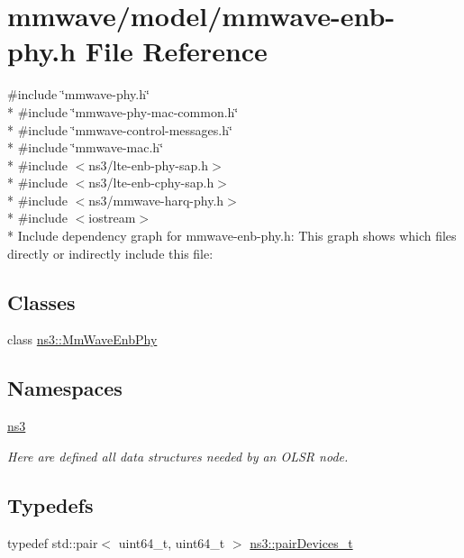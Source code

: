 \hypertarget{mmwave-enb-phy_8h}{}\section{mmwave/model/mmwave-\/enb-\/phy.h File Reference}
\label{mmwave-enb-phy_8h}
{\ttfamily \#include \char`\"{}mmwave-\/phy.\+h\char`\"{}}\\*
{\ttfamily \#include \char`\"{}mmwave-\/phy-\/mac-\/common.\+h\char`\"{}}\\*
{\ttfamily \#include \char`\"{}mmwave-\/control-\/messages.\+h\char`\"{}}\\*
{\ttfamily \#include \char`\"{}mmwave-\/mac.\+h\char`\"{}}\\*
{\ttfamily \#include $<$ns3/lte-\/enb-\/phy-\/sap.\+h$>$}\\*
{\ttfamily \#include $<$ns3/lte-\/enb-\/cphy-\/sap.\+h$>$}\\*
{\ttfamily \#include $<$ns3/mmwave-\/harq-\/phy.\+h$>$}\\*
{\ttfamily \#include $<$iostream$>$}\\*
Include dependency graph for mmwave-\/enb-\/phy.h\+:
This graph shows which files directly or indirectly include this file\+:
\subsection*{Classes}
\begin{DoxyCompactItemize}
\item 
class \hyperlink{classns3_1_1MmWaveEnbPhy}{ns3\+::\+Mm\+Wave\+Enb\+Phy}
\end{DoxyCompactItemize}
\subsection*{Namespaces}
\begin{DoxyCompactItemize}
\item 
 \hyperlink{namespacens3}{ns3}
\begin{DoxyCompactList}\small\item\em Here are defined all data structures needed by an O\+L\+SR node. \end{DoxyCompactList}\end{DoxyCompactItemize}
\subsection*{Typedefs}
\begin{DoxyCompactItemize}
\item 
typedef std\+::pair$<$ uint64\+\_\+t, uint64\+\_\+t $>$ \hyperlink{namespacens3_abe460b1ad735ce7c8e408857371b87af}{ns3\+::pair\+Devices\+\_\+t}
\end{DoxyCompactItemize}
